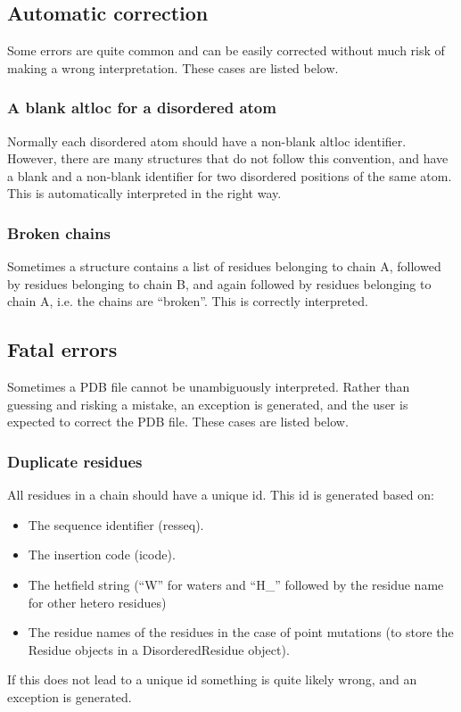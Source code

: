 \documentclass{report}
\begin{document}
\subsection{Automatic correction}

Some errors are quite common and can be easily corrected without much risk of
making a wrong interpretation. These cases are listed below.

\subsubsection{A blank altloc for a disordered atom}

Normally each disordered atom should have a non-blank altloc identifier. However,
there are many structures that do not follow this convention, and have a blank
and a non-blank identifier for two disordered positions of the same atom. This
is automatically interpreted in the right way.

\subsubsection{Broken chains}

Sometimes a structure contains a list of residues belonging to chain A, followed
by residues belonging to chain B, and again followed by residues belonging to
chain A, i.e. the chains are ``broken''. This is correctly interpreted.

\subsection{Fatal errors}

Sometimes a PDB file cannot be unambiguously interpreted. Rather than guessing
and risking a mistake, an exception is generated, and the user is expected to
correct the PDB file. These cases are listed below.

\subsubsection{Duplicate residues}

All residues in a chain should have a unique id. This id is generated based
on:

\begin{itemize}
\item The sequence identifier (resseq).
\item The insertion code (icode).
\item The hetfield string (``W'' for waters and ``H\_'' followed by the
residue name for other hetero residues)
\item The residue names of the residues in the case of point mutations (to store the
Residue objects in a DisorderedResidue object).
\end{itemize}
If this does not lead to a unique id something is quite likely wrong, and an
exception is generated.
\end{document}
